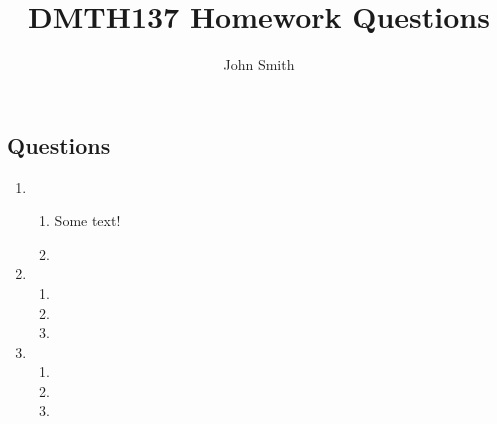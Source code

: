 \documentclass[12pt]{report}
\title{DMTH137 Homework Questions}
\author{John Smith}
\date{} %
\begin{document}
\maketitle
\onehalfspacing

\begin{center}
	\section*{Questions}
\end{center}

\begin{enumerate}
\setlength{\itemsep}{20pt}	
	
	\item
	
	\begin{enumerate}
	\setlength{\itemsep}{10pt}
		
		\item Some text!
		\item
		
	\end{enumerate}
	
	\item
	
	\begin{enumerate}
	\setlength{\itemsep}{10pt}
	
		\item
		\item
		\item
		
	\end{enumerate}
	
	\item
	
	\begin{enumerate}
	\setlength{\itemsep}{10pt}
	
		\item
		\item
		\item
		
	\end{enumerate}
	
\end{enumerate}
\end{document}

